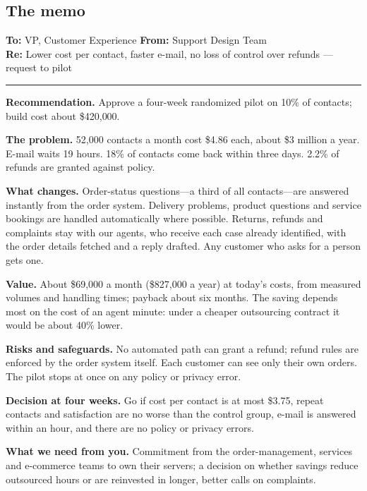 \subsection{The memo}

\begin{tcolorbox}[colback=white, colframe=black!60, boxrule=0.6pt, arc=1pt, left=10pt, right=10pt, top=8pt, bottom=8pt, fontupper=\small]
\textbf{To:} VP, Customer Experience \hfill \textbf{From:} Support Design Team\\
\textbf{Re:} Lower cost per contact, faster e-mail, no loss of control over refunds --- request to pilot

\smallskip\hrule\smallskip

\textbf{Recommendation.} Approve a four-week randomized pilot on 10\% of contacts; build cost about \$420{,}000.

\textbf{The problem.} 52{,}000 contacts a month cost \$4.86 each, about \$3 million a year. E-mail waits 19 hours. 18\% of contacts come back within three days. 2.2\% of refunds are granted against policy.

\textbf{What changes.} Order-status questions---a third of all contacts---are answered instantly from the order system. Delivery problems, product questions and service bookings are handled automatically where possible. Returns, refunds and complaints stay with our agents, who receive each case already identified, with the order details fetched and a reply drafted. Any customer who asks for a person gets one.

\textbf{Value.} About \$69{,}000 a month (\$827{,}000 a year) at today's costs, from measured volumes and handling times; payback about six months. The saving depends most on the cost of an agent minute: under a cheaper outsourcing contract it would be about 40\% lower.

\textbf{Risks and safeguards.} No automated path can grant a refund; refund rules are enforced by the order system itself. Each customer can see only their own orders. The pilot stops at once on any policy or privacy error.

\textbf{Decision at four weeks.} Go if cost per contact is at most \$3.75, repeat contacts and satisfaction are no worse than the control group, e-mail is answered within an hour, and there are no policy or privacy errors.

\textbf{What we need from you.} Commitment from the order-management, services and e-commerce teams to own their servers; a decision on whether savings reduce outsourced hours or are reinvested in longer, better calls on complaints.
\end{tcolorbox}

